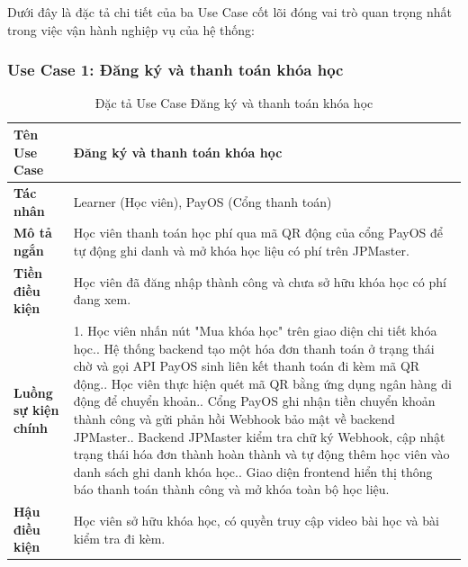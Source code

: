 \documentclass[../DoAn.tex]{subfiles}
\begin{document}
Dưới đây là đặc tả chi tiết của ba Use Case cốt lõi đóng vai trò quan trọng nhất trong việc vận hành nghiệp vụ của hệ thống:

\subsubsection*{Use Case 1: Đăng ký và thanh toán khóa học}
\begin{table}[H]
\centering
\small
\renewcommand{\arraystretch}{1.2}


\begin{tabular}{|p{3.5cm}|p{11.0cm}|}
\hline
\textbf{Tên Use Case} & Đăng ký và thanh toán khóa học \\
\hline
\textbf{Tác nhân} & Learner (Học viên), PayOS (Cổng thanh toán) \\
\hline
\textbf{Mô tả ngắn} & Học viên thanh toán học phí qua mã QR động của cổng PayOS để tự động ghi danh và mở khóa học liệu có phí trên JPMaster. \\
\hline
\textbf{Tiền điều kiện} & Học viên đã đăng nhập thành công và chưa sở hữu khóa học có phí đang xem. \\
\hline
\textbf{Luồng sự kiện chính} & 
1. Học viên nhấn nút "Mua khóa học" trên giao diện chi tiết khóa học.\newline
2. Hệ thống backend tạo một hóa đơn thanh toán ở trạng thái chờ và gọi API PayOS sinh liên kết thanh toán đi kèm mã QR động.\newline
3. Học viên thực hiện quét mã QR bằng ứng dụng ngân hàng di động để chuyển khoản.\newline
4. Cổng PayOS ghi nhận tiền chuyển khoản thành công và gửi phản hồi Webhook bảo mật về backend JPMaster.\newline
5. Backend JPMaster kiểm tra chữ ký Webhook, cập nhật trạng thái hóa đơn thành hoàn thành và tự động thêm học viên vào danh sách ghi danh khóa học.\newline
6. Giao diện frontend hiển thị thông báo thanh toán thành công và mở khóa toàn bộ học liệu. \\
\hline
\textbf{Hậu điều kiện} & Học viên sở hữu khóa học, có quyền truy cập video bài học và bài kiểm tra đi kèm. \\
\hline
\end{tabular}
\caption{Đặc tả Use Case Đăng ký và thanh toán khóa học}
\label{tab:spec_payment}
\end{table}
\end{document}
